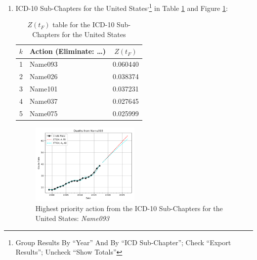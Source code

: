 \documentclass[10pt, a4paper, twocolumn]{IEEEconf}
\begin{document}
\begin{enumerate}
  \item ICD-10 Sub-Chapters for the United States\cite{centers2017underlying}\textsuperscript{,}\footnote{Group Results By \enquote{Year} And By \enquote{ICD Sub-Chapter}; Check \enquote{Export Results}; Uncheck \enquote{Show Totals}} in Table \ref{table:ztable6} and Figure \ref{fig:k6}:
    \begin{table}[H]
      \centering
      \begin{tabular}{clc}
        \toprule
          $k$ & Action (Eliminate: \ldots) & $Z(t_F)$ \\
        \midrule
          1   & Name093 & 0.060440 \\
          2   & Name026 & 0.038374 \\
          3   & Name101 & 0.037231 \\
          4   & Name037 & 0.027645 \\
          5   & Name075 & 0.025999 \\
        \bottomrule
      \end{tabular}
      \caption{$Z(t_F)$ table for the ICD-10 Sub-Chapters for the United States}
      \label{table:ztable6}
    \end{table}
    \begin{figure}[H]
      \centering
      \includegraphics[width=0.5\textwidth]{results/US_ICD10_SUB_CHAPTERS/Name093_ets.png}
      \caption{Highest priority action from the ICD-10 Sub-Chapters for the United States: \textit{Name093}}\label{fig:k6}
    \end{figure}
    

\end{enumerate}
\end{document}
